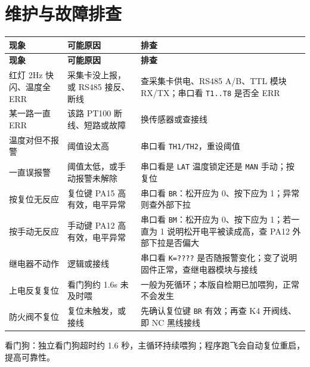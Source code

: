 \documentclass[a4paper,11pt]{ctexart}
\newenvironment{notebox}[1][red!7]{%
  \def\noteboxcolor{#1}%
  \par\smallskip\noindent
  \begin{lrbox}{\noteboxsave}%
  \begin{minipage}{\dimexpr\linewidth-2\fboxsep-2\fboxrule\relax}\small\setlength{\parskip}{2pt}}%
  {\end{minipage}\end{lrbox}%
  \fcolorbox{black!35}{\noteboxcolor}{\usebox{\noteboxsave}}\par\smallskip}
\begin{document}
\section{维护与故障排查}
\renewcommand{\arraystretch}{1.25}
\begin{center}
\begin{longtable}{|L{3.6cm}|L{4.2cm}|L{6.0cm}|}
\hline
\textbf{现象} & \textbf{可能原因} & \textbf{排查}\\
\hline
\endfirsthead
\hline
\textbf{现象} & \textbf{可能原因} & \textbf{排查}\\
\hline
\endhead
红灯 2Hz 快闪、温度全 ERR & 采集卡没上报，或 RS485 接反、断线 & 查采集卡供电、RS485 A/B、TTL 模块 RX/TX；串口看 \texttt{T1..T8} 是否全 ERR\\
\hline
某一路一直 ERR & 该路 PT100 断线、短路或故障 & 换传感器或查接线\\
\hline
温度对但不报警 & 阈值设太高 & 串口看 \texttt{TH1/TH2}，重设阈值\\
\hline
一直误报警 & 阈值太低，或手动报警未解除 & 串口看是 \texttt{LAT} 温度锁定还是 \texttt{MAN} 手动；按复位\\
\hline
按复位无反应 & 复位键 PA15 高有效，电平异常 & 串口看 \texttt{BR}：松开应为 0、按下应为 1；异常则查外部下拉\\
\hline
按手动无反应 & 手动键 PA12 高有效，电平异常 & 串口看 \texttt{BM}：松开应为 0、按下应为 1；若一直为 1 说明松开电平被读成高，查 PA12 外部下拉是否偏大\\
\hline
继电器不动作 & 逻辑或接线 & 串口看 \texttt{K=????} 是否随报警变化；变了说明固件正常，查继电器模块与接线\\
\hline
上电反复复位 & 看门狗约 1.6s 未及时喂 & 一般为死循环；本版自检期已加喂狗，正常不会发生\\
\hline
防火阀不复位 & 复位未触发，或接线 & 先确认复位键 \texttt{BR} 有效；再查 K4 开阀线、即 NC 黑线接线\\
\hline
\end{longtable}
\end{center}
\renewcommand{\arraystretch}{1.0}
\begin{notebox}[blue!6]
看门狗：独立看门狗超时约 1.6 秒，主循环持续喂狗；程序跑飞会自动复位重启，提高可靠性。
\end{notebox}

\end{document}
